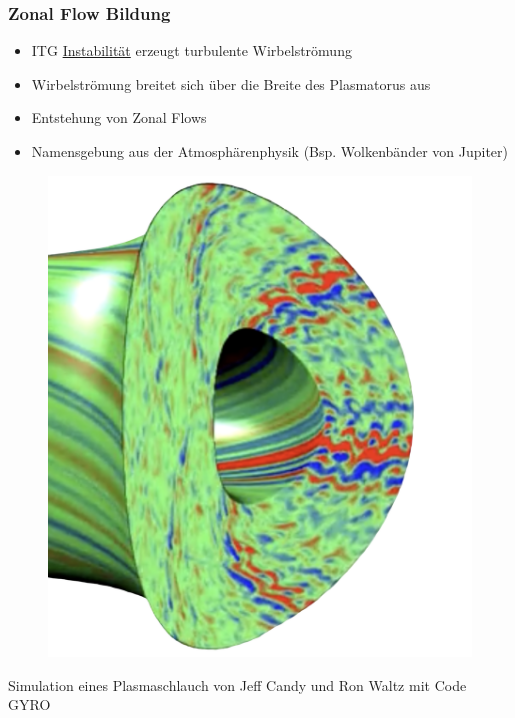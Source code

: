 \documentclass[compress,aspectratio=43]{beamer}
\makeatletter
\let\UL\ul
\renewcommand\ul{
	\let\set@color\beamerorig@set@color 
	\let\reset@color\beamerorig@reset@color 
	\UL}
\makeatother
\begin{document}
	\begin{frame}
		\frametitle{Zonal Flow Bildung}
		\begin{minipage}{0.6\textwidth}\raggedleft
			\centering
			\begin{itemize}
				\item ITG \ul{Instabilität} erzeugt turbulente Wirbelströmung
				\item Wirbelströmung breitet sich über die Breite des Plasmatorus aus
				\item Entstehung von \alert{Zonal Flows}
				\item Namensgebung aus der Atmosphärenphysik (Bsp. Wolkenbänder von Jupiter)
			\end{itemize}
		\end{minipage}
		\begin{minipage}{0.3\textwidth}
			\begin{figure}%
				\href{https://www.youtube.com/watch?v=O6tUHzfj-zM}{\includegraphics[width=\textwidth]{Presentation/turbulence.png}}
			\end{figure}
			{\tiny Simulation eines Plasmaschlauch von Jeff Candy und Ron Waltz mit Code GYRO}
		\end{minipage}
	\end{frame}
\end{document}
